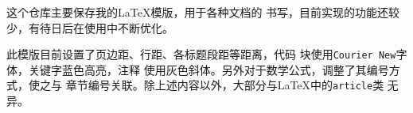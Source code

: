 这个仓库主要保存我的\LaTeX 模版，用于各种文档的
书写，目前实现的功能还较少，有待日后在使用中不断优化。

此模版目前设置了页边距、行距、各标题段距等距离，代码
块使用\verb!Courier New!字体，关键字蓝色高亮，注释
使用灰色斜体。另外对于数学公式，调整了其编号方式，使之与
章节编号关联。除上述内容以外，大部分与\LaTeX 中的\verb!article!类
无异。

